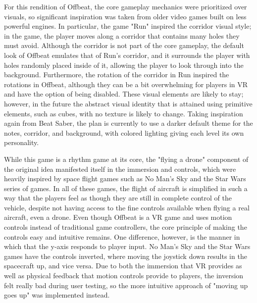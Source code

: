 \documentclass[10pt,twocolumn]{article}
\begin{document}
For this rendition of Offbeat, the core gameplay mechanics were prioritized over visuals, so significant inspiration was taken from older video games built on less powerful engines. In particular, the game "Run" inspired the corridor visual style; in the game, the player moves along a corridor that contains many holes they must avoid. Although the corridor is not part of the core gameplay, the default look of Offbeat emulates that of Run's corridor, and it surrounds the player with holes randomly placed inside of it, allowing the player to look through into the background. Furthermore, the rotation of the corridor in Run inspired the rotations in Offbeat, although they can be a bit overwhelming for players in VR and have the option of being disabled. These visual elements are likely to stay; however, in the future the abstract visual identity that is attained using primitive elements, such as cubes, with no texture is likely to change. Taking inspiration again from Beat Saber, the plan is currently to use a darker default theme for the notes, corridor, and background, with colored lighting giving each level its own personality.

While this game is a rhythm game at its core, the "flying a drone" component of the original idea manifested itself in the immersion and controls, which were heavily inspired by space flight games such as No Man's Sky and the Star Wars series of games. In all of these games, the flight of aircraft is simplified in such a way that the players feel as though they are still in complete control of the vehicle, despite not having access to the fine controls available when flying a real aircraft, even a drone. Even though Offbeat is a VR game and uses motion controls instead of traditional game controllers, the core principle of making the controls easy and intuitive remains. One difference, however, is the manner in which that the y-axis responds to player input. No Man's Sky and the Star Wars games have the controls inverted, where moving the joystick down results in the spacecraft up, and vice versa. Due to both the immersion that VR provides as well as physical feedback that motion controls provide to players, the inversion felt really bad during user testing, so the more intuitive approach of "moving up goes up" was implemented instead.
\end{document}
